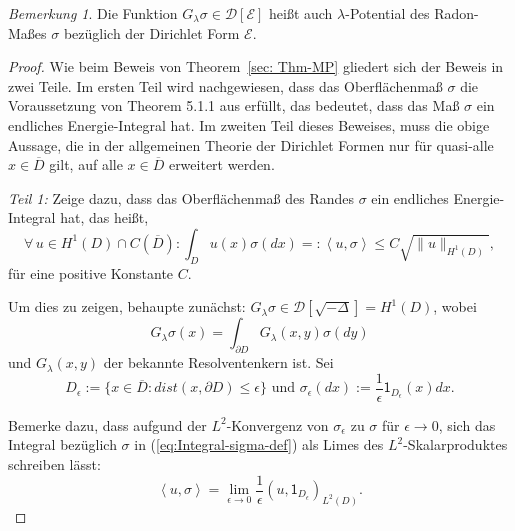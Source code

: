 \documentclass[10pt, a4paper, leqno, twoside, bibliography=totocnumbered, final]{scrartcl}
\theoremstyle{definition}
\theoremstyle{plain}%
\theoremstyle{remark}
\newtheorem*{bem}{Bemerkung}
\begin{document}
\begin{bem}
Die Funktion $ G_{\lambda}\sigma \in \mathcal{D}[\mathcal{E}] $ heißt auch $ \lambda $-Potential des Radon-Maßes $ \sigma $ bezüglich der Dirichlet Form $ \mathcal{E} $.
\end{bem}

\begin{proof}
Wie beim Beweis von Theorem~\ref{sec: Thm-MP} gliedert sich der Beweis in zwei Teile. Im ersten Teil wird nachgewiesen, dass das Oberflächenmaß $ \sigma $ die Voraussetzung von Theorem 5.1.1 aus \cite{Fukushima} erfüllt, das bedeutet, dass das Maß $ \sigma $ ein endliches Energie-Integral hat. Im zweiten Teil dieses Beweises, muss die obige Aussage, die in der allgemeinen Theorie der Dirichlet Formen nur für quasi-alle $ x \in \overline{D} $ gilt, auf alle $ x \in \overline{D} $ erweitert werden.

\emph{Teil 1:} Zeige dazu, dass das Oberflächenmaß des Randes $ \sigma $ ein endliches Energie-Integral hat, das heißt,
\begin{equation}
\label{eq:Integral-sigma-def}
\forall \, u \in H^1(D) \cap C(\overline{D}): \int_D u(x) \sigma(dx) =: \left\langle u, \sigma \right\rangle \leq C \sqrt{\| u \|_{H^1(D)}},
\end{equation} 
für eine positive Konstante $C$.

Um dies zu zeigen, behaupte zunächst: $ G_{\lambda} \sigma \in \mathcal{D}[\sqrt{-\Delta}] = H^1(D) $, wobei 
\begin{equation}
G_{\lambda} \sigma (x) = \int_{\partial D} G_{\lambda} (x,y) \sigma (dy)
\end{equation}
und $ G_{\lambda} (x,y) $ der bekannte Resolventenkern ist. Sei 
\begin{equation}
D_{\epsilon} := \{ x \in \overline{D} : dist(x, \partial D) \leq \epsilon \} \text{ und } \sigma_{\epsilon} (dx) := \frac{1}{\epsilon} \mathsf{1}_{D_{\epsilon}} (x) dx.
\end{equation}

Bemerke dazu, dass aufgund der $ L^2 $-Konvergenz von $ \sigma_{\epsilon} $ zu $ \sigma $ für $ \epsilon \to 0 $, sich das Integral bezüglich $ \sigma $ in (\ref{eq:Integral-sigma-def}) als Limes des $ L^2 $-Skalarproduktes schreiben lässt:
\begin{equation*}
\left\langle u, \sigma \right\rangle = \lim_{\epsilon \to 0 } \frac{1}{\epsilon} \left( u,  \mathsf{1}_{D_{\epsilon}} \right)_{L^2(D)}.
\end{equation*}


\end{proof}
\end{document}
